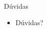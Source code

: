 \documentclass[xcolor=svgnames,handout]{beamer}
\begin{document}
\begin{frame}{Dúvidas}
	\begin{itemize}
	\item Dúvidas?
	\end{itemize}
\end{frame}


\end{document}

